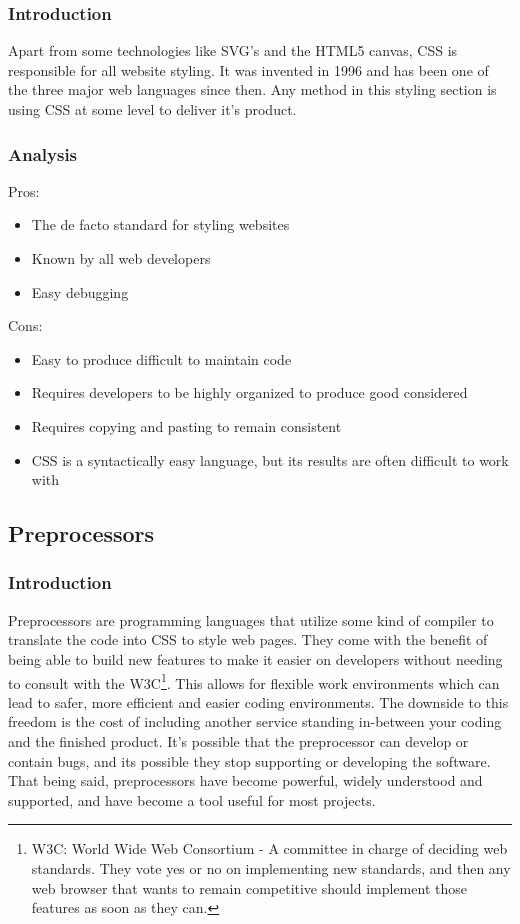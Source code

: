 \documentclass[draftclsnofoot,onecolumn,letterpaper,10pt,compsoc]{IEEEtran}
\begin{document}
    \subsubsection{Introduction}

    Apart from some technologies like SVG's and the HTML5 canvas, CSS is responsible for all website styling.
    It was invented in 1996 and has been one of the three major web languages since then.
    Any method in this styling section is using CSS at some level to deliver it's product.

    \subsubsection{Analysis}
    Pros:
    \begin{itemize}
      \item The de facto standard for styling websites
      \item Known by all web developers
      \item Easy debugging
    \end{itemize}

    Cons:
    \begin{itemize}
      \item Easy to produce difficult to maintain code
      \item Requires developers to be highly organized to produce good considered
      \item Requires copying and pasting to remain consistent
      \item CSS is a syntactically easy language, but its results are often difficult to work with
    \end{itemize}

  \subsection{Preprocessors}
    \subsubsection{Introduction}

    Preprocessors are programming languages that utilize some kind of compiler to translate the code into CSS to style web pages.
    They come with the benefit of being able to build new features to make it easier on developers without needing to consult with the W3C\footnote{W3C: World Wide Web Consortium - A committee in charge of deciding web standards. They vote yes or no on implementing new standards, and then any web browser that wants to remain competitive should implement those features as soon as they can.}.
    This allows for flexible work environments which can lead to safer, more efficient and easier coding environments.
    The downside to this freedom is the cost of including another service standing in-between your coding and the finished product.
    It's possible that the preprocessor can develop or contain bugs, and its possible they stop supporting or developing the software.
    That being said, preprocessors have become powerful, widely understood and supported, and have become a tool useful for most projects.
\end{document}

